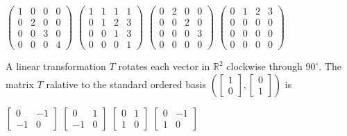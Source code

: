 \documentclass[10pt]{exam}
\newcommand{\R}{\ensuremath{\mathbb{R}}}
\begin{document}
\begin{questions}
\begin{oneparchoices}
\choice $ \begin{pmatrix}
1 & 0 & 0 & 0 \\ 
0 & 2 & 0 & 0 \\ 
0 & 0 & 3 & 0 \\ 
0 & 0 & 0 & 4
\end{pmatrix} $
\choice $ \begin{pmatrix}
1 & 1 & 1 & 1 \\ 
0 & 1 & 2 & 3 \\ 
0 & 0 & 1 & 3 \\ 
0 & 0 & 0 & 1
\end{pmatrix} $
\choice $ \begin{pmatrix}
0 & 2 & 0 & 0 \\ 
0 & 0 & 2 & 0 \\ 
0 & 0 & 0 & 3 \\ 
0 & 0 & 0 & 0
\end{pmatrix} $
\choice $ \begin{pmatrix}
0 & 1 & 2 & 3 \\ 
0 & 0 & 0 & 0 \\ 
0 & 0 & 0 & 0 \\ 
0 & 0 & 0 & 0
\end{pmatrix} $
\end{oneparchoices}
\question 
A linear transformation $T$ rotates each vector in $\R^2$ clockwise through $90^{\circ}$. The matrix $T$ ralative to the standard
ordered basis $\left(\begin{bmatrix}1 \\ 0 \end{bmatrix} ,\begin{bmatrix} 0 \\ 1 \end{bmatrix} \right)$ is

\begin{oneparchoices}
\choice $\begin{bmatrix}0 & -1 \\ -1 & 0\end{bmatrix} $
\choice $\begin{bmatrix}0 & 1 \\ -1 & 0\end{bmatrix} $
\choice $\begin{bmatrix}0 & 1 \\ 1 & 0\end{bmatrix} $
\choice $\begin{bmatrix}0 & -1 \\ 1 & 0\end{bmatrix} $
\end{oneparchoices}


\end{questions}
\end{document}

